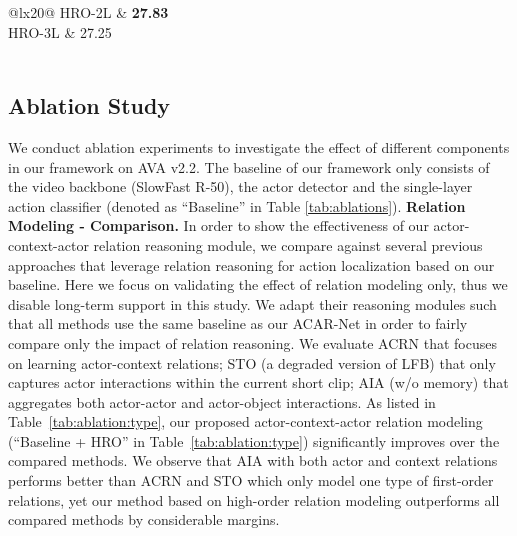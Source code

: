 \begin{table*}[!t]
{\begin{tabular}{@{}lx{20}@{}}
 {HRO-2L} & \textbf{27.83}\\
 {HRO-3L} & 27.25\\
\\
\end{tabular}}\hfill
{}

\vspace{2mm}
\caption{\textbf{Ablation study on AVA dataset}. The ``Baseline" of our framework only consists of the video backbone, actor detector and one-layer action classifier. HRO: High-order Relation Reasoning Operator. ACFB: Actor-Context Feature Bank. \label{tab:ablations}}
\vspace{-3mm}
\end{table*}



\subsection{Ablation Study}
We conduct ablation experiments to investigate the effect of different components in our framework on AVA v2.2. The baseline of our framework only consists of the video backbone (SlowFast R-50), the actor detector and the single-layer action classifier (denoted as ``Baseline'' in Table \ref{tab:ablations}).
\vspace{-3mm}
{\flushleft \bf Relation Modeling - Comparison.} In order to show the effectiveness of our actor-context-actor relation reasoning module, we compare against several previous approaches that leverage relation reasoning for action localization based on our baseline. Here we focus on validating the effect of relation modeling only, thus we disable long-term support in this study.
We adapt their reasoning modules such that all methods use the same baseline as our ACAR-Net in order to fairly compare only the impact of relation reasoning. We evaluate 
ACRN that focuses on learning actor-context relations; STO \cite{wu2019long} (a degraded version of LFB) that only captures actor interactions within the current short clip; AIA (w/o memory) \cite{tang2020asynchronous} that aggregates both actor-actor and actor-object interactions. As listed in Table~\ref{tab:ablation:type}, our proposed actor-context-actor relation modeling (``Baseline + HRO'' in Table~\ref{tab:ablation:type}) significantly improves over the compared methods. We observe that AIA with both actor and context relations performs better than ACRN and STO which only model one type of first-order relations, yet our method based on high-order relation modeling outperforms all compared methods by considerable margins. 

